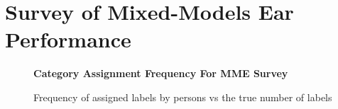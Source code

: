 \documentclass[\main/thesis.tex]{subfiles}
\begin{document}
 \section{Survey of Mixed-Models Ear Performance}
\label{survey:2p}
\begin{figure}[htpb]
    \begin{center}
    \textbf{Category Assignment Frequency For MME Survey}
    \end{center}
    \caption{Frequency of assigned labels by persons vs the true number of labels}
\label{fig:freq-survey-2p}
\end{figure}
\begin{table}[htbp]
\caption{\label{kappa_table}Table of Fleiss' kappa coefficient to measure the degree of agreement between persons (HvH), persons with FC model (H+FC), persons with CNNLSTM model, persons with all models (H+ALL), and the 3 models }
\end{table}
\end{document}
